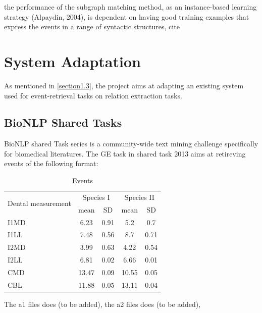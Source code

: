 the performance of the subgraph matching method, as an instance-based learning strategy (Alpaydin, 2004), is dependent on having good training examples that express the events in a range of syntactic structures, cite





\section{System Adaptation}
As mentioned in \ref{section1.3}, the project aims at adapting an existing system used for event-retrieval tasks on relation extraction tasks.
\subsection{BioNLP Shared Tasks}
BioNLP shared Task series is a community-wide text mining challenge specifically for biomedical literatures. The GE task in shared task 2013 aims at retireving events of the following format:
\begin{table}
	\caption{Events}
	\centering
	\label{table:events}
	\begin{tabular}{l c c c c}
		\hline 
		\multirow{2}{*}{Dental measurement} & \multicolumn{2}{c}{Species I} & \multicolumn{2}{c}{Species II} \\ 
		\cline{2-5}
		& mean & SD  & mean & SD  \\ 
		\hline
		I1MD & 6.23 & 0.91 & 5.2  & 0.7  \\
		
		I1LL & 7.48 & 0.56 & 8.7  & 0.71 \\
		
		I2MD & 3.99 & 0.63 & 4.22 & 0.54 \\
		
		I2LL & 6.81 & 0.02 & 6.66 & 0.01 \\
		
		CMD & 13.47 & 0.09 & 10.55 & 0.05 \\
		
		CBL & 11.88 & 0.05 & 13.11 & 0.04\\ 
		\hline 
	\end{tabular}
\end{table}

The a1 files does (to be added), the a2 files does (to be added), 

